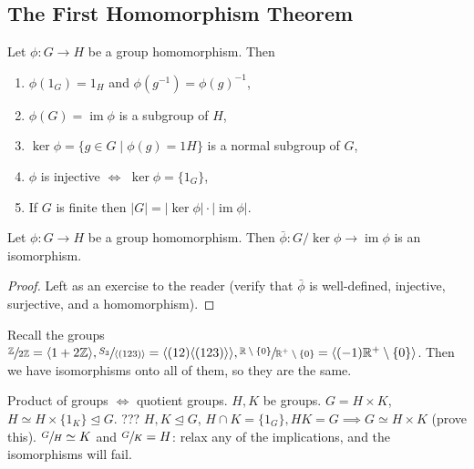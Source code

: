 \subsection{The First Homomorphism Theorem}
\begin{remark}
    Let $ \phi \colon G \to H$ be a group homomorphism. Then
    \begin{enumerate}
        \item $\phi(1_G)=1_H$ and $\phi(g^{-1})=\phi(g)^{-1}$,
        \item $\phi(G) = \operatorname{im}\phi$ is a subgroup of $H$,
        \item $\ker \phi = \{g\in G \mid \phi(g)=1 H\} $ is a normal subgroup of $G$,
        \item $\phi$ is injective $\iff$ $\ker \phi = \{1_G\}$,
        \item If $G$ is finite then $|G|=|\ker \phi|\cdot |\operatorname{im} \phi|$.
    \end{enumerate}
\end{remark}
\begin{theorem}
    Let $ \phi \colon G \to H$ be a group homomorphism. Then $\bar{\phi} \colon G/\operatorname{ker}\phi \to \operatorname{im} \phi$ is an isomorphism.
\end{theorem}
\begin{proof}
    Left as an exercise to the reader (verify that $\bar{\phi}$ is well-defined, injective, surjective, and a homomorphism).
\end{proof}
\begin{example}
    Recall the groups $\sfrac{\mathbb{Z}}{2\mathbb{Z}} = \langle 1+2\mathbb{Z} \rangle, \sfrac{S_3}{\langle (123) \rangle} = \langle (12)\langle (123) \rangle  \rangle, \sfrac{\mathbb{R}\setminus \{0\} }{\mathbb{R}^{+}\setminus \{0\} } = \langle (-1)\mathbb{R}^{+}\setminus \{0\}  \rangle $. Then we have isomorphisms onto all of them, so they are the same.
\end{example}
\begin{remark}
    Product of groups $\iff$ quotient groups. $H, K$ be groups. 
    $G=H\times K$, $H \simeq H \times \{1_K\} \trianglelefteq G$. ???
    $H,K \trianglelefteq G$, $H \cap K = \{1_G\} , HK=G \implies G \simeq H \times K$ (prove this). $\sfrac{G}{H} \simeq K$ and $\sfrac{G}{K}=H$: relax any of the implications, and the isomorphisms will fail.
\end{remark}

